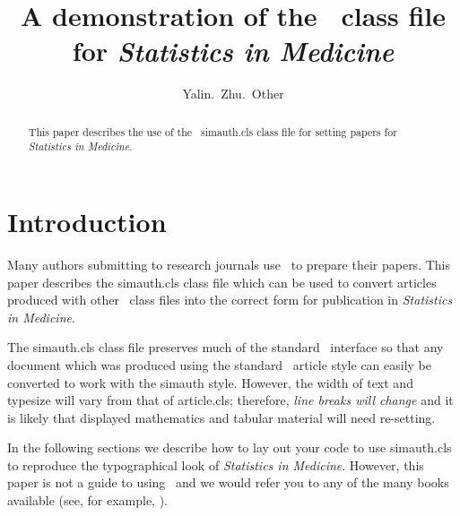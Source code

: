 \documentclass[times]{simauth}
\begin{document}

\title{A demonstration of the \LaTeXe\ class file for
\itshape{Statistics in Medicine}\footnotemark[2]}

\author{Yalin.~Zhu.~Other\corrauth}

\address{John Wiley \& Sons, Ltd, The Atrium, Southern Gate, Chichester,
West Sussex, PO19~8SQ, UK}


\begin{abstract}
This paper describes the use of the \LaTeXe\ \textsf{simauth.cls}
class file for setting papers for \emph{Statistics in Medicine}.
\end{abstract}


\maketitle


\section{Introduction}
Many authors submitting to research journals use \LaTeXe\ to
prepare their papers. This paper describes the
\textsf{simauth.cls} class file which can be used to convert
articles produced with other \LaTeXe\ class files into the correct
form for publication in \emph{Statistics in Medicine}.

The \textsf{simauth.cls} class file preserves much of the standard
\LaTeXe\ interface so that any document which was produced using
the standard \LaTeXe\ \textsf{article} style can easily be
converted to work with the \textsf{simauth} style. However, the
width of text and typesize will vary from that of
\textsf{article.cls}; therefore, \emph{line breaks will change}
and it is likely that displayed mathematics and tabular material
will need re-setting.

In the following sections we describe how to lay out your code to
use \textsf{simauth.cls} to reproduce the typographical look of
\emph{Statistics in Medicine}. However, this paper is not a guide
to using \LaTeXe\ and we would refer you to any of the many books
available (see, for example, \cite{R1,R2,R3}).
\end{document}
